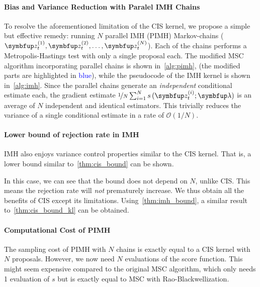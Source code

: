 

\vspace{-0.1in}
\paragraph{Bias and Variance Reduction with Paralel IMH Chains}
To resolve the aforementioned limitation of the CIS kernel, we propose a simple but effective remedy: running \(N\) parallel IMH (PIMH) Markov-chains (\(\vz_t^{(1)}, \vz_t^{(2)}, \ldots, \vz_t^{(N)}\)).
Each of the chains performs a Metropolis-Hastings test with only a single proposal each.
The modified MSC algorithm incorporating parallel chains is shown in~\cref{alg:pimh}, (the modified parts are highlighted in \textcolor{blue}{blue}), while the pseudocode of the IMH kernel is shown in~\cref{alg:imh}.
Since the parallel chains generate an \textit{independent} conditional estimate each, the gradient estimate \(\nicefrac{1}{N} \sum^{N}_{i=1} s\,(\vz_t^{(i)}; \vlambda)\) is an average of \(N\) independent and identical estimators.
This trivially reduces the variance of a single conditional estimate in a rate of \(\mathcal{O}(1/N)\).
%
%

\vspace{-0.1in}
\paragraph{Lower bound of rejection rate in IMH}
IMH also enjoys variance control properties similar to the CIS kernel.
That is, a lower bound similar to~\cref{thm:cis_bound} can be shown.
%

%
In this case, we can see that the bound does not depend on \(N\), unlike CIS.
This means the rejection rate will \textit{not} prematurely increase.
We thus obtain all the benefits of CIS except its limitations.
Using~\cref{thm:imh_bound}, a similar result to~\cref{thm:cis_bound_kl} can be obtained.

\vspace{-0.1in}
\paragraph{Computational Cost of PIMH}
The sampling cost of PIMH with \(N\) chains is exactly equal to a CIS kernel with \(N\) proposals.
However, we now need \(N\) evaluations of the score function.
This might seem expensive compared to the original MSC algorithm, which only needs 1 evaluation of \(s\) but is exactly equal to MSC with Rao-Blackwellization.


